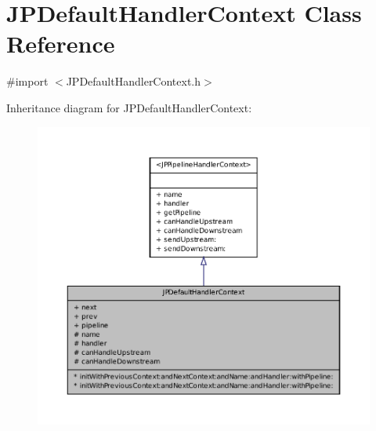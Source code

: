 \hypertarget{a00011}{
\section{JPDefaultHandlerContext Class Reference}
\label{a00011}
}


{\ttfamily \#import $<$JPDefaultHandlerContext.h$>$}



Inheritance diagram for JPDefaultHandlerContext:\nopagebreak
\begin{figure}[H]
\begin{center}
\leavevmode
\includegraphics[width=400pt]{a00094}
\end{center}
\end{figure}



